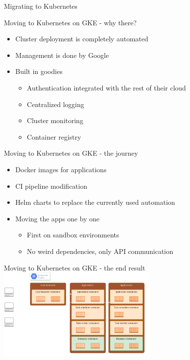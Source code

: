 \documentclass{beamer}
\newcommand{\imageframe}[2]{{
  \usebackgroundtemplate{\texttt{[image: \#1]}}
  \begin{frame}{\vspace{-6pt}\usebeamercolor[fg]{item}\huge{#2}}
  \end{frame}
}}
\begin{document}

  \imageframe{images/migrating_cranes.jpg}{Migrating to Kubernetes}

  \begin{frame}{Moving to Kubernetes on GKE - why there?}
  \begin{itemize}
    \item Cluster deployment is completely automated
    \item Management is done by Google
    \item Built in goodies
    \begin{itemize}
      \item Authentication integrated with the rest of their cloud
      \item Centralized logging
      \item Cluster monitoring
      \item Container registry
    \end{itemize}
  \end{itemize}
  \end{frame}

  \begin{frame}{Moving to Kubernetes on GKE - the journey}
  \begin{itemize}
    \item Docker images for applications
    \item CI pipeline modification
    \item Helm charts to replace the currently used automation
    \item Moving the apps one by one
    \begin{itemize}
      \item First on sandbox environments
      \item No weird dependencies, only API communication
    \end{itemize}
  \end{itemize}
  \end{frame}

  \begin{frame}{Moving to Kubernetes on GKE - the end result}
  \centering
  \includegraphics[width=8cm]{images/kubernetes_diagram.png}
  \end{frame}
\end{document}
